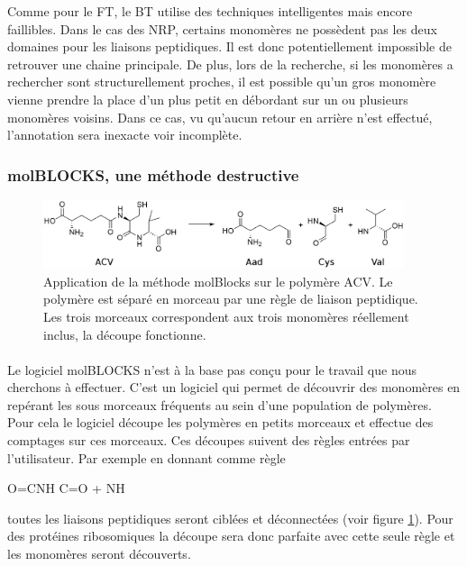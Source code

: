 \documentclass[12pt,french,twoside]{report}
\begin{document}
Comme pour le FT, le BT utilise des techniques intelligentes mais encore faillibles.
Dans le cas des NRP, certains monomères ne possèdent pas les deux domaines pour les liaisons peptidiques.
Il est donc potentiellement impossible de retrouver une chaine principale.
De plus, lors de la recherche, si les monomères a rechercher sont structurellement proches, il est possible qu'un gros monomère vienne prendre la place d'un plus petit en débordant sur un ou plusieurs monomères voisins.
Dans ce cas, vu qu'aucun retour en arrière n'est effectué, l'annotation sera inexacte voir incomplète.


\subsubsection{molBLOCKS, une méthode destructive}

\begin{figure}[!h]
  \begin{center}
    \includegraphics[width=400px]{Figures/s2m/Intro/molBlocks.png}
    \caption{\label{molBlocks}Application de la méthode molBlocks sur le polymère ACV.
    Le polymère est séparé en morceau par une règle de liaison peptidique.
    Les trois morceaux correspondent aux trois monomères réellement inclus, la découpe fonctionne.}
  \end{center}
\end{figure}

\paragraph{}Le logiciel molBLOCKS n'est à la base pas conçu pour le travail que nous cherchons à effectuer.
C'est un logiciel qui permet de découvrir des monomères en repérant les sous morceaux fréquents au sein d'une population de polymères.
Pour cela le logiciel découpe les polymères en petits morceaux et effectue des comptages sur ces morceaux.
Ces découpes suivent des règles entrées par l'utilisateur.
Par exemple en donnant comme règle
\begin{chemmath}
  O=CNH \longrightarrow C=O + NH
\end{chemmath}
toutes les liaisons peptidiques seront ciblées et déconnectées (voir figure \ref{molBlocks}).
Pour des protéines ribosomiques la découpe sera donc parfaite avec cette seule règle et les monomères seront découverts.
\end{document}
